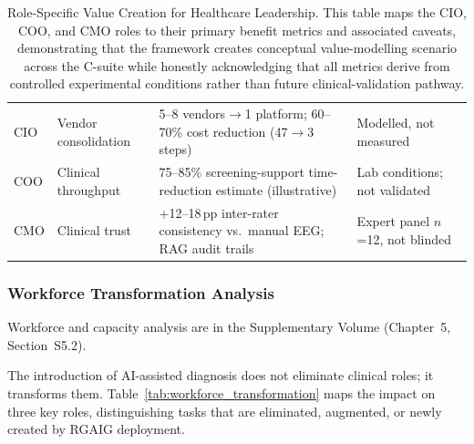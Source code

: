 \begin{table}[H]
\tablestripes\tablefontsize
\caption[Role-Specific Value Creation for Healthcare Leadership]{Role-Specific Value Creation for Healthcare Leadership. This table maps the CIO, COO, and CMO roles to their primary benefit metrics and associated caveats, demonstrating that the framework creates conceptual value-modelling scenario across the C-suite while honestly acknowledging that all metrics derive from controlled experimental conditions rather than future clinical-validation pathway.}
\tablefontsize
\begin{tabularx}{\textwidth}{@{} >{\raggedright\arraybackslash}p{0.8cm} >{\raggedright\arraybackslash}p{1.6cm} L L @{}}
\toprule
{} &  &  &  \\
\midrule
CIO & Vendor consolidation & 5--8 vendors$\to$1 platform; 60--70\% cost reduction (47$\to$3 steps) & Modelled, not measured \\
\addlinespace
COO & Clinical throughput & 75--85\% screening-support time-reduction estimate (illustrative) & Lab conditions; not validated \\
\addlinespace
CMO & Clinical trust & +12--18\,pp inter-rater consistency vs.\ manual EEG; RAG audit trails & Expert panel $n$=12, not blinded \\
\bottomrule
\end{tabularx}
\end{table}

\subsubsection{Workforce Transformation Analysis}

Workforce and capacity analysis are in the Supplementary Volume (Chapter~5, Section~S5.2).

\iffalse
The introduction of AI-assisted diagnosis does not eliminate clinical roles; it transforms them. Table~\ref{tab:workforce_transformation} maps the impact on three key roles, distinguishing tasks that are eliminated, augmented, or newly created by RGAIG deployment.

